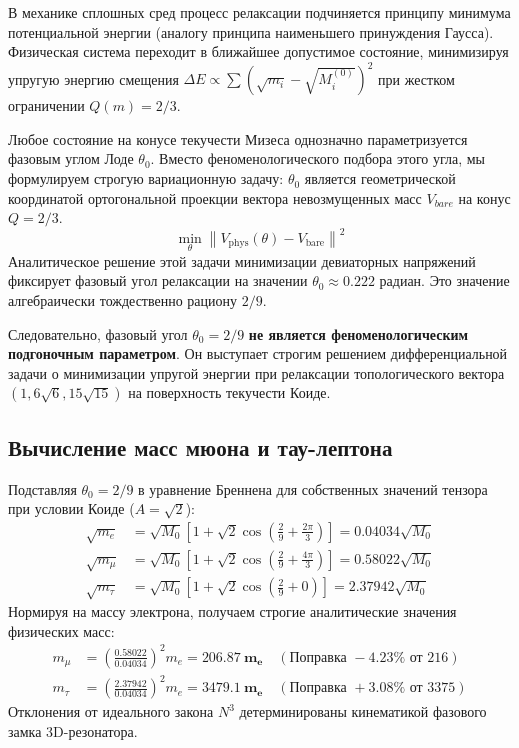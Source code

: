 \documentclass[12pt,a4paper]{article}
\begin{document}
	В механике сплошных сред процесс релаксации подчиняется принципу минимума потенциальной энергии (аналогу принципа наименьшего принуждения Гаусса). Физическая система переходит в ближайшее допустимое состояние, минимизируя упругую энергию смещения $\Delta E \propto \sum (\sqrt{m_i} - \sqrt{M_i^{(0)}})^2$ при жестком ограничении $Q(m) = 2/3$.
	
	Любое состояние на конусе текучести Мизеса однозначно параметризуется фазовым углом Лоде $\theta_0$. Вместо феноменологического подбора этого угла, мы формулируем строгую вариационную задачу: $\theta_0$ является геометрической координатой ортогональной проекции вектора невозмущенных масс $V_{bare}$ на конус $Q=2/3$.
	\begin{equation}
		\min_{\theta} \left\| V_{\text{phys}}(\theta) - V_{\text{bare}} \right\|^2 
	\end{equation}
	Аналитическое решение этой задачи минимизации девиаторных напряжений фиксирует фазовый угол релаксации на значении $\theta_0 \approx 0.222$ радиан. Это значение алгебраически тождественно рациону $2/9$. 
	
	Следовательно, фазовый угол $\theta_0 = 2/9$ \textbf{не является феноменологическим подгоночным параметром}. Он выступает строгим решением дифференциальной задачи о минимизации упругой энергии при релаксации топологического вектора $(1, 6\sqrt{6}, 15\sqrt{15})$ на поверхность текучести Коиде.
			
	\subsection{Вычисление масс мюона и тау-лептона}
	Подставляя $\theta_0 = 2/9$ в уравнение Бреннена для собственных значений тензора при условии Коиде ($A = \sqrt{2}$):
	\begin{align}
		\sqrt{m_e} &= \sqrt{M_0} \left[ 1 + \sqrt{2}\cos\left(\frac{2}{9} + \frac{2\pi}{3}\right) \right] = 0.04034 \sqrt{M_0} \\
		\sqrt{m_\mu} &= \sqrt{M_0} \left[ 1 + \sqrt{2}\cos\left(\frac{2}{9} + \frac{4\pi}{3}\right) \right] = 0.58022 \sqrt{M_0} \\
		\sqrt{m_\tau} &= \sqrt{M_0} \left[ 1 + \sqrt{2}\cos\left(\frac{2}{9} + 0\right) \right] = 2.37942 \sqrt{M_0}
	\end{align}
	Нормируя на массу электрона, получаем строгие аналитические значения физических масс:
	\begin{align}
		m_\mu &= \left(\frac{0.58022}{0.04034}\right)^2 m_e = \mathbf{206.87 \ m_e} \quad (\text{Поправка } -4.23\% \text{ от } 216) \\
		m_\tau &= \left(\frac{2.37942}{0.04034}\right)^2 m_e = \mathbf{3479.1 \ m_e} \quad (\text{Поправка } +3.08\% \text{ от } 3375)
	\end{align}
	Отклонения от идеального закона $N^3$ детерминированы кинематикой фазового замка 3D-резонатора.
	
\end{document}
